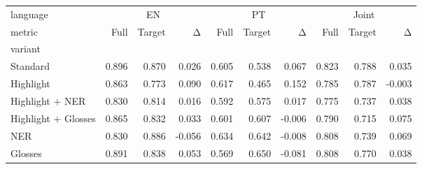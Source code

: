 \begin{tabular}{lrrrrrrrrr}
\toprule
language & \multicolumn{3}{c}{EN} & \multicolumn{3}{c}{PT} & \multicolumn{3}{c}{Joint} \\
metric & Full & Target & Δ & Full & Target & Δ & Full & Target & Δ \\
variant &  &  &  &  &  &  &  &  &  \\
\midrule
Standard & 0.896 & 0.870 & 0.026 & 0.605 & 0.538 & 0.067 & 0.823 & 0.788 & 0.035 \\
Highlight & 0.863 & 0.773 & 0.090 & 0.617 & 0.465 & 0.152 & 0.785 & 0.787 & -0.003 \\
Highlight + NER & 0.830 & 0.814 & 0.016 & 0.592 & 0.575 & 0.017 & 0.775 & 0.737 & 0.038 \\
Highlight + Glosses & 0.865 & 0.832 & 0.033 & 0.601 & 0.607 & -0.006 & 0.790 & 0.715 & 0.075 \\
NER & 0.830 & 0.886 & -0.056 & 0.634 & 0.642 & -0.008 & 0.808 & 0.739 & 0.069 \\
Glosses & 0.891 & 0.838 & 0.053 & 0.569 & 0.650 & -0.081 & 0.808 & 0.770 & 0.038 \\
\bottomrule
\end{tabular}
